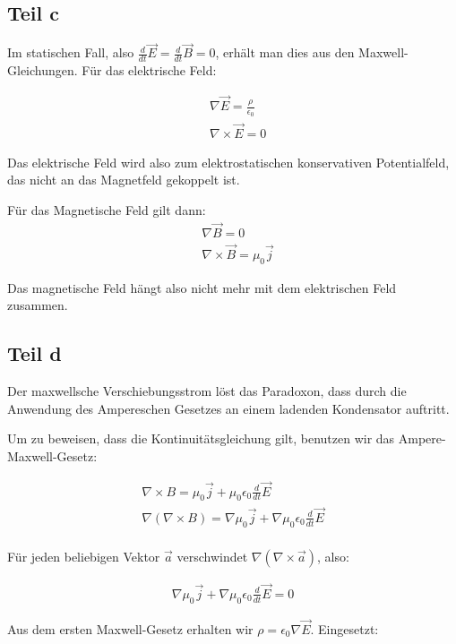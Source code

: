 \documentclass[a4paper,german,12pt,smallheadings]{scrartcl}
\begin{document}
\subsection*{Teil c}
Im statischen Fall, also $\frac{d}{dt} \vec{E} = \frac{d}{dt} \vec{B} = 0$,
erhält man dies aus den Maxwell-Gleichungen. Für das elektrische Feld:

\begin{align*}
  &\nabla \vec{E} = \frac{\rho}{\epsilon_0} \\
  &\nabla \times \vec{E} = 0
\end{align*}

Das elektrische Feld wird also zum elektrostatischen konservativen
Potentialfeld, das nicht an das Magnetfeld gekoppelt ist.

Für das Magnetische Feld gilt dann:
\begin{align*}
  &\nabla \vec{B} = 0 \\
  &\nabla \times \vec{B} = \mu_0 \vec{j}
\end{align*}

Das magnetische Feld hängt also nicht mehr mit dem elektrischen Feld zusammen.

\subsection*{Teil d}

Der maxwellsche Verschiebungsstrom löst das Paradoxon, dass durch die Anwendung
des Ampereschen Gesetzes an einem ladenden Kondensator auftritt.

Um zu beweisen, dass die Kontinuitätsgleichung gilt, benutzen wir das
Ampere-Maxwell-Gesetz:

\begin{align*}
  \nabla \times B = \mu_0 \vec{j} + \mu_0 \epsilon_0 \frac{d}{dt} \vec{E} \\
  \nabla(\nabla \times B) = \nabla \mu_0 \vec{j} + \nabla \mu_0 \epsilon_0 \frac{d}{dt} \vec{E} \\
\end{align*}

Für jeden beliebigen Vektor $\vec{a}$ verschwindet $\nabla(\nabla \times \vec{a})$, also:

\begin{align*}
  \nabla \mu_0 \vec{j} + \nabla \mu_0 \epsilon_0 \frac{d}{dt} \vec{E} = 0
\end{align*}

Aus dem ersten Maxwell-Gesetz erhalten wir $\rho = \epsilon_0 \nabla \vec{E}$.
Eingesetzt:
\end{document}
